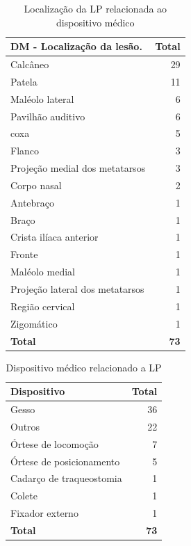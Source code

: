 \documentclass[
  a4paper]{article}
\begin{document}
\begin{table}[H]

\caption{\label{tab:unnamed-chunk-19}Localização da LP relacionada ao dispositivo médico}
\centering
\begin{tabular}[t]{lr}
\toprule
DM - Localização da lesão. & Total\\
\midrule
Calcâneo & 29\\
Patela & 11\\
Maléolo lateral & 6\\
Pavilhão auditivo & 6\\
coxa & 5\\
\addlinespace
Flanco & 3\\
Projeção medial dos metatarsos & 3\\
Corpo nasal & 2\\
Antebraço & 1\\
Braço & 1\\
\addlinespace
Crista ilíaca anterior & 1\\
Fronte & 1\\
Maléolo medial & 1\\
Projeção lateral dos metatarsos & 1\\
Região cervical & 1\\
\addlinespace
Zigomático & 1\\
\midrule
\textbf{Total} & \textbf{73}\\
\bottomrule
\end{tabular}
\end{table}

\begin{table}[H]

\caption{\label{tab:unnamed-chunk-20}Dispositivo médico relacionado a LP}
\centering
\begin{tabular}[t]{lr}
\toprule
Dispositivo & Total\\
\midrule
Gesso & 36\\
Outros & 22\\
Órtese de locomoção & 7\\
Órtese de posicionamento & 5\\
Cadarço de traqueostomia & 1\\
\addlinespace
Colete & 1\\
Fixador externo & 1\\
\midrule
\textbf{Total} & \textbf{73}\\
\bottomrule
\end{tabular}
\end{table}
\end{document}
